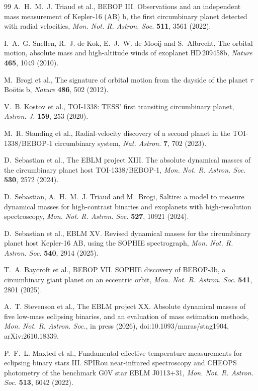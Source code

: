 \documentclass[3p,11pt]{elsarticle}
\begin{document}
\begin{thebibliography}{99}
A.~H.~M.~J. Triaud et al., BEBOP III. Observations and an independent mass measurement of
Kepler-16 (AB) b, the first circumbinary planet detected with radial velocities, \emph{Mon. Not.
R. Astron. Soc.} \textbf{511}, 3561 (2022).

I.~A.~G. Snellen, R.~J. de Kok, E.~J.~W. de Mooij and S.~Albrecht, The orbital motion, absolute
mass and high-altitude winds of exoplanet HD\,209458b, \emph{Nature} \textbf{465}, 1049 (2010).

M.~Brogi et al., The signature of orbital motion from the dayside of the planet $\tau$ Bo\"otis b,
\emph{Nature} \textbf{486}, 502 (2012).

V.~B. Kostov et al., TOI-1338: TESS' first transiting circumbinary planet, \emph{Astron. J.}
\textbf{159}, 253 (2020).

M.~R. Standing et al., Radial-velocity discovery of a second planet in the TOI-1338/BEBOP-1
circumbinary system, \emph{Nat. Astron.} \textbf{7}, 702 (2023).

D.~Sebastian et al., The EBLM project XIII. The absolute dynamical masses of the circumbinary
planet host TOI-1338/BEBOP-1, \emph{Mon. Not. R. Astron. Soc.} \textbf{530}, 2572 (2024).

D.~Sebastian, A.~H.~M.~J. Triaud and M.~Brogi, Saltire: a model to measure dynamical masses for
high-contrast binaries and exoplanets with high-resolution spectroscopy, \emph{Mon. Not. R.
Astron. Soc.} \textbf{527}, 10921 (2024).

D.~Sebastian et al., EBLM XV. Revised dynamical masses for the circumbinary planet host Kepler-16
AB, using the SOPHIE spectrograph, \emph{Mon. Not. R. Astron. Soc.} \textbf{540}, 2914 (2025).

T.~A. Baycroft et al., BEBOP VII. SOPHIE discovery of BEBOP-3b, a circumbinary giant planet on an
eccentric orbit, \emph{Mon. Not. R. Astron. Soc.} \textbf{541}, 2801 (2025).

A.~T. Stevenson et al., The EBLM project XX. Absolute dynamical masses of five low-mass eclipsing
binaries, and an evaluation of mass estimation methods, \emph{Mon. Not. R. Astron. Soc.}, in press
(2026), doi:10.1093/mnras/stag1904, arXiv:2610.18339.

P.~F.~L. Maxted et al., Fundamental effective temperature measurements for eclipsing binary
stars III. SPIRou near-infrared spectroscopy and CHEOPS photometry of the benchmark G0V star EBLM
J0113+31, \emph{Mon. Not. R. Astron. Soc.} \textbf{513}, 6042 (2022).


\end{thebibliography}
\end{document}
